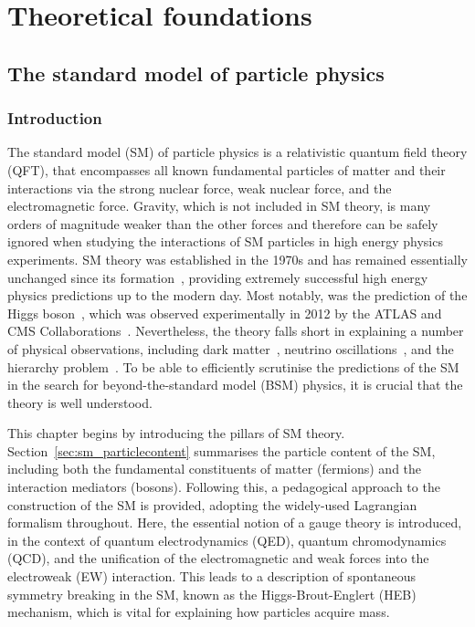 \chapter{Theoretical foundations}
\label{chap:theory}

\section{The standard model of particle physics}
\subsection{Introduction}

The standard model (SM) of particle physics is a relativistic quantum field theory (QFT), that encompasses all known fundamental particles of matter and their interactions via the strong nuclear force, weak nuclear force, and the electromagnetic force. Gravity, which is not included in SM theory, is many orders of magnitude weaker than the other forces and therefore can be safely ignored when studying the interactions of SM particles in high energy physics experiments. SM theory was established in the 1970s and has remained essentially unchanged since its formation~\cite{Glashow:1961tr,Weinberg:1967tq,Salam:1968rm}, providing extremely successful high energy physics predictions up to the modern day. Most notably, was the prediction of the Higgs boson~\cite{Englert:1964et,HIGGS1964132,Higgs:1964pj,Guralnik:1964eu,PhysRev.145.1156,PhysRev.155.1554}, which was observed experimentally in 2012 by the ATLAS and CMS Collaborations~\cite{Aad:2012tfa,Chatrchyan:2012xdj,Chatrchyan:2013lba}. Nevertheless, the theory falls short in explaining a number of physical observations, including dark matter~\cite{Aghanim:2018eyx}, neutrino oscillations~\cite{Fukuda:1998mi}, and the hierarchy problem~\cite{PhysRevD.13.974,PhysRevD.20.2619}. To be able to efficiently scrutinise the predictions of the SM in the search for beyond-the-standard model (BSM) physics, it is crucial that the theory is well understood.

This chapter begins by introducing the pillars of SM theory. Section~\ref{sec:sm_particlecontent} summarises the particle content of the SM, including both the fundamental constituents of matter (fermions) and the interaction mediators (bosons). Following this, a pedagogical approach to the construction of the SM is provided, adopting the widely-used Lagrangian formalism throughout. Here, the essential notion of a gauge theory is introduced, in the context of quantum electrodynamics (QED), quantum chromodynamics (QCD), and the unification of the electromagnetic and weak forces into the electroweak (EW) interaction. This leads to a description of spontaneous symmetry breaking in the SM, known as the Higgs-Brout-Englert (HEB) mechanism, which is vital for explaining how particles acquire mass. 


